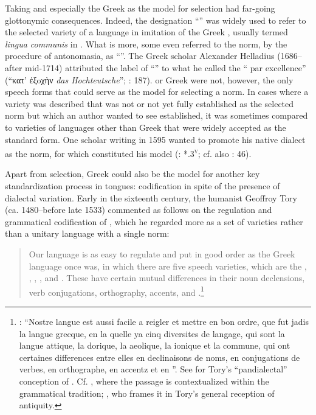 Taking  and especially the Greek  as the model for selection had far-going glottonymic consequences. Indeed, the designation “” was widely used to refer to the selected variety of a  language in imitation of the Greek , usually termed \textit{lingua communis} in . What is more, some even referred to the  norm, by the procedure of antonomasia, as “”. The Greek scholar Alexander Helladius (1686–after mid-1714) attributed the label of “” to what he called the “ par excellence” (“κατ’ ἐξoχὴν \textit{das Hochteutsche}”; \citealt{Helladius1714}: 187).  or  Greek were not, however, the only speech forms that could serve as the model for selecting a  norm. In cases where a  variety was described that was not or not yet fully established as the selected norm but which an author wanted to see established, it was sometimes compared to varieties of languages other than Greek that were widely accepted as the standard form. One scholar writing in 1595 wanted to promote his native  dialect as the  norm, for which   constituted his model (\citealt{Veranzio1595}: *.3\textsc{\textsuperscript{v}}; cf. also \citealt{Schoppe1636}: 46).

Apart from selection, Greek could also be the model for another key standardization process in  tongues: codification in spite of the presence of dialectal variation. Early in the sixteenth century, the  humanist Geoffroy Tory (ca. 1480–before late 1533) commented as follows on the regulation and grammatical codification of , which he regarded more as a set of varieties rather than a unitary language with a single norm:

\begin{quote}
Our language is as easy to regulate and put in good order as the Greek language once was, in which there are five speech varieties, which are the , , , , and . These have certain mutual differences in their noun declensions, verb conjugations, orthography, accents, and .\footnote{\citet[\textsc{iv}\textsc{\textsuperscript{v}}\textsc{–v}\textsc{\textsuperscript{r}}]{Tory1529}: “Nostre langue est aussi facile a reigler et mettre en bon ordre, que fut jadis la langue grecque, en la quelle ya cinq diversites de langage, qui sont la langue attique, la dorique, la aeolique, la ionique et la commune, qui ont certaines differences entre elles en declinaisons de noms, en conjugations de verbes, en orthographe, en accentz et en ”. See \citet[466--467]{Trudeau1983} for Tory’s “pandialectal” conception of . Cf. \citet[19--20]{Defaux2003}, where the passage is contextualized within the  grammatical tradition; \citet[23]{Cordier2006}, who frames it in Tory’s general reception of antiquity.}
\end{quote}

